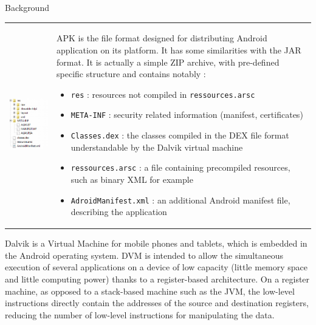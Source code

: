 \begin{chaptercover}{Background}
\begin{indentbox}{1cm}
\begin{tabular}{C{.3\linewidth}m{.66\linewidth}}
  \includegraphics[width=.35\textwidth]{figures/apk-file-structure}
   &
  APK is the file format designed for distributing Android application on its platform. It has some similarities with the JAR format. It is actually a simple ZIP archive, with pre-defined specific structure and contains notably :
  \begin{itemize}
    \item \texttt{res} :  resources not compiled in \texttt{ressources.arsc}
    \item \texttt{META-INF} : security related information (manifest, certificates)
    \item \texttt{Classes.dex} : the classes compiled in the DEX file format understandable by the Dalvik virtual machine
    \item \texttt{ressources.arsc} : a file containing precompiled resources, such as binary XML for example
    \item \texttt{AdroidManifest.xml} : an additional Android manifest file, describing the application
  \end{itemize}
  \\
\end{tabular}

Dalvik \cite{course-embedded-device} is a Virtual Machine for mobile phones and tablets, which is embedded in the Android operating system. DVM is intended to allow the simultaneous execution of several applications on a device of low capacity (little memory space and little computing power) thanks to a register-based architecture. On a register machine, as opposed to a stack-based machine such as the JVM, the low-level instructions directly contain the addresses of the source and destination registers, reducing the number of low-level instructions for manipulating the data.


\end{indentbox}
\end{chaptercover}

